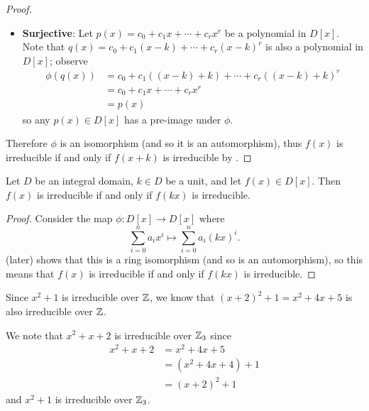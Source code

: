 \begin{proof}
\begin{itemize}
        \item \textbf{Surjective}: Let $p(x) = c_0 + c_1x + \cdots + c_rx^r$ be a polynomial in $D[x]$. Note that $q(x) = c_0 + c_1(x-k) + \cdots + c_r(x-k)^r$ is also a polynomial in $D[x]$; observe
        \begin{align*}
            \phi(q(x)) &= c_0 + c_1((x-k)+k) + \cdots + c_r((x-k)+k)^r\\
            &= c_0 + c_1x + \cdots + c_rx^r\\
            &= p(x)
        \end{align*}
        so any $p(x) \in D[x]$ has a pre-image under $\phi$.
    \end{itemize}
    Therefore $\phi$ is an isomorphism (and so it is an automorphism), thus $f(x)$ is irreducible if and only if $f(x+k)$ is irreducible by .
\end{proof}

\begin{corollary}\label{corollary-irreducible-iff-constant-factor-multiple-is-irreducible}
    Let $D$ be an integral domain, $k \in D$ be a unit, and let $f(x) \in D[x]$. Then $f(x)$ is irreducible if and only if $f(kx)$ is irreducible.
\end{corollary}
\begin{proof}
    Consider the map $\phi: D[x] \to D[x]$ where
    \[
        \sum_{i=0}^n a_ix^i \mapsto \sum_{i=0}^na_i(kx)^i.
    \]
     (later) shows that this is a ring isomorphism (and so is an automorphism), so this means that $f(x)$ is irreducible if and only if $f(kx)$ is irreducible.
\end{proof}

\begin{example}
    Since $x^2 + 1$ is irreducible over $\mathbb{Z}$, we know that $(x+2)^2 + 1 = x^2 + 4x + 5$ is also irreducible over $\mathbb{Z}$.
\end{example}

\begin{example}
    We note that $x^2 + x + 2$ is irreducible over $\mathbb{Z}_3$ since
    \begin{align*}
        x^2 + x + 2 &= x^2 + 4x + 5\\
        &= (x^2 + 4x + 4) + 1\\
        &= (x+2)^2 + 1
    \end{align*}
    and $x^2 + 1$ is irreducible over $\mathbb{Z}_3$.
\end{example}

